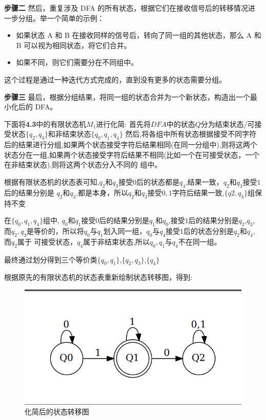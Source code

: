 \documentclass{article}
\begin{document}
    \textbf{步骤二}
    然后，重复涉及 DFA 的所有状态，根据它们在接收信号后的转移情况进一步分组。举一个简单的示例：
    \begin{itemize}
        \item 如果状态 A 和 B 在接收同样的信号后，转向了同一组的其他状态，那么 A 和 B 可以视为相同状态，将它们合并。
        \item 如果不同，则它们需要分在不同组中。
    \end{itemize}
    这个过程是通过一种迭代方式完成的，直到没有更多的状态需要分组。

    \textbf{步骤三}
    最后，根据分组结果，将同一组的状态合并为一个新状态，构造出一个最小化后的 DFA。
    

下面将\textbf{4.3}中的有限状态机$M_1$进行化简:
首先将$DFA$中的状态$Q$分为结束状态/可接受状态$\{q_2,q_3\}$和非结束状态$\{q_0,q_1,q_4\}$
然后,将各组中所有状态根据接受不同字符后的结果进行分组,如果两个状态接受字符后结果相同(在同一分组中),则将这两个
状态分在一组,如果两个状态接受字符后结果不相同(比如一个在可接受状态，一个在非结束状态),则将这两个状态分入不同的
组中。

根据有限状态机的状态表可知,$q_2$和$q_3$接受$0$后的状态都是$q_4$,结果一致，$q_2$和$q_3$接受$1$后的结果分别是
$q_2$和$q_3$,都是本身，所以$q_2$和$q_3$接受$0,1$字符后结果一致,$\{q2,q_3\}$组保持不变

在$\{q_0,q_1,q_4\}$组中, $q_0$和$q_1$接受$0$后的结果分别是$q_1$和$q_0$,接受$1$后的结果分别是$q_2$,$q_3$,
而$q_2,q_3$是等价的，所以将$q_0$与$q_1$划入同一组，$q_0$与$q_4$接受$1$后的状态分别是$q_2$和$q_4$, 而$q_2$属于
可接受状态，$q_4$属于非结束状态,所以$q_0,q_1$与$q_4$不在同一组。

最终通过划分得到三个等价类$\{q_0,q_1\}$,$\{q_2,q_3\}$,$\{q_4\}$

根据原先的有限状态机的状态表重新绘制状态转移图，得到:

\begin{figure}[h]
    \centering
    \includegraphics[scale=0.2]{../Img/minimized_dfa_example.png}
    \caption{化简后的状态转移图}
\end{figure}
\end{document}
